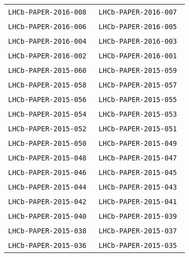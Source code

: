 \begin{center}
\begin{longtable}{ll}
\texttt{LHCb-PAPER-2016-008}~\cite{LHCb-PAPER-2016-008} &
\texttt{LHCb-PAPER-2016-007}~\cite{LHCb-PAPER-2016-007} \\
\texttt{LHCb-PAPER-2016-006}~\cite{LHCb-PAPER-2016-006} &
\texttt{LHCb-PAPER-2016-005}~\cite{LHCb-PAPER-2016-005} \\
\texttt{LHCb-PAPER-2016-004}~\cite{LHCb-PAPER-2016-004} &
\texttt{LHCb-PAPER-2016-003}~\cite{LHCb-PAPER-2016-003} \\
\texttt{LHCb-PAPER-2016-002}~\cite{LHCb-PAPER-2016-002} &
\texttt{LHCb-PAPER-2016-001}~\cite{LHCb-PAPER-2016-001} \\
\midrule
\texttt{LHCb-PAPER-2015-060}~\cite{LHCb-PAPER-2015-060} &
\texttt{LHCb-PAPER-2015-059}~\cite{LHCb-PAPER-2015-059} \\
\texttt{LHCb-PAPER-2015-058}~\cite{LHCb-PAPER-2015-058} &
\texttt{LHCb-PAPER-2015-057}~\cite{LHCb-PAPER-2015-057} \\
\texttt{LHCb-PAPER-2015-056}~\cite{LHCb-PAPER-2015-056} &
\texttt{LHCb-PAPER-2015-055}~\cite{LHCb-PAPER-2015-055} \\
\texttt{LHCb-PAPER-2015-054}~\cite{LHCb-PAPER-2015-054} &
\texttt{LHCb-PAPER-2015-053}~\cite{LHCb-PAPER-2015-053} \\
\texttt{LHCb-PAPER-2015-052}~\cite{LHCb-PAPER-2015-052} &
\texttt{LHCb-PAPER-2015-051}~\cite{LHCb-PAPER-2015-051} \\
\texttt{LHCb-PAPER-2015-050}~\cite{LHCb-PAPER-2015-050} &
\texttt{LHCb-PAPER-2015-049}~\cite{LHCb-PAPER-2015-049} \\
\texttt{LHCb-PAPER-2015-048}~\cite{LHCb-PAPER-2015-048} &
\texttt{LHCb-PAPER-2015-047}~\cite{LHCb-PAPER-2015-047} \\
\texttt{LHCb-PAPER-2015-046}~\cite{LHCb-PAPER-2015-046} &
\texttt{LHCb-PAPER-2015-045}~\cite{LHCb-PAPER-2015-045} \\
\texttt{LHCb-PAPER-2015-044}~\cite{LHCb-PAPER-2015-044} &
\texttt{LHCb-PAPER-2015-043}~\cite{LHCb-PAPER-2015-043} \\
\texttt{LHCb-PAPER-2015-042}~\cite{LHCb-PAPER-2015-042} &
\texttt{LHCb-PAPER-2015-041}~\cite{LHCb-PAPER-2015-041} \\
\texttt{LHCb-PAPER-2015-040}~\cite{LHCb-PAPER-2015-040} &
\texttt{LHCb-PAPER-2015-039}~\cite{LHCb-PAPER-2015-039} \\
\texttt{LHCb-PAPER-2015-038}~\cite{LHCb-PAPER-2015-038} &
\texttt{LHCb-PAPER-2015-037}~\cite{LHCb-PAPER-2015-037} \\
\texttt{LHCb-PAPER-2015-036}~\cite{LHCb-PAPER-2015-036} &
\texttt{LHCb-PAPER-2015-035}~\cite{LHCb-PAPER-2015-035} \\

\end{longtable}
\end{center}
